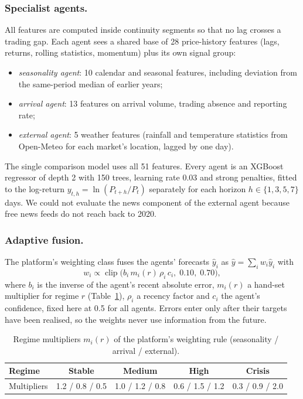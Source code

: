 \documentclass[runningheads]{llncs}
\begin{document}
\subsubsection{Specialist agents.} All features are computed inside continuity segments so that no lag crosses a trading gap. Each agent sees a shared base of 28 price-history features (lags, returns, rolling statistics, momentum) plus its own signal group:
\begin{itemize}
\item \emph{seasonality agent}: 10 calendar and seasonal features, including deviation from the same-period median of earlier years;
\item \emph{arrival agent}: 13 features on arrival volume, trading absence and reporting rate;
\item \emph{external agent}: 5 weather features (rainfall and temperature statistics from Open-Meteo for each market's location, lagged by one day).
\end{itemize}
The single comparison model uses all 51 features. Every agent is an XGBoost regressor \cite{chen2016} of depth 2 with 150 trees, learning rate 0.03 and strong penalties, fitted to the log-return $y_{t,h}=\ln(P_{t+h}/P_t)$ separately for each horizon $h\in\{1,3,5,7\}$ days. We could not evaluate the news component of the external agent because free news feeds do not reach back to 2020.

\subsubsection{Adaptive fusion.} The platform's weighting class fuses the agents' forecasts $\hat y_i$ as $\hat y=\sum_i w_i\hat y_i$ with
\begin{equation}
w_i \propto \operatorname{clip}\bigl(b_i\, m_i(r)\, \rho_i\, c_i,\; 0.10,\; 0.70\bigr),
\end{equation}
where $b_i$ is the inverse of the agent's recent absolute error, $m_i(r)$ a hand-set multiplier for regime $r$ (Table~\ref{tab:mult}), $\rho_i$ a recency factor and $c_i$ the agent's confidence, fixed here at 0.5 for all agents. Errors enter only after their targets have been realised, so the weights never use information from the future.

\begin{table}[!htb]
\centering
\caption{Regime multipliers $m_i(r)$ of the platform's weighting rule (seasonality / arrival / external).}
\label{tab:mult}
\setlength{\tabcolsep}{8pt}
\begin{tabular}{lcccc}
\toprule
Regime & Stable & Medium & High & Crisis\\
\midrule
Multipliers & 1.2 / 0.8 / 0.5 & 1.0 / 1.2 / 0.8 & 0.6 / 1.5 / 1.2 & 0.3 / 0.9 / 2.0\\
\bottomrule
\end{tabular}
\end{table}
\end{document}
